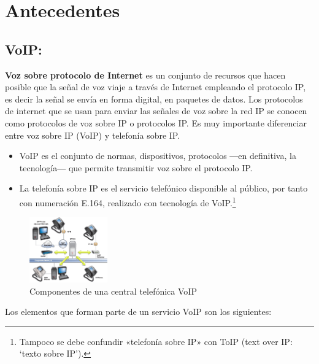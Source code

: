 \documentclass[conference]{IEEEtran}
\begin{document}
\section{Antecedentes}\label{sec:ant}
\subsection{\textbf{ VoIP:}} 
\textbf{Voz sobre protocolo de Internet} es un conjunto de recursos que hacen posible que la señal de voz viaje a través de Internet empleando el protocolo IP, es decir la señal se envía en forma digital, en paquetes de datos. Los protocolos de internet que se usan para enviar las señales de voz sobre la red IP se conocen como protocolos de voz sobre IP o protocolos IP. 
Es muy importante diferenciar entre voz sobre IP (VoIP) y telefonía sobre IP.
\begin{itemize}
\item VoIP es el conjunto de normas, dispositivos, protocolos ―en definitiva, la tecnología― que permite transmitir voz sobre el protocolo IP.
\item La telefonía sobre IP es el servicio telefónico disponible al público, por tanto con numeración E.164, realizado con tecnología de VoIP.\footnote{Tampoco se debe confundir «telefonía sobre IP» con ToIP (text over IP: ‘texto sobre IP’).}
\end{itemize}
\begin{figure}[h]
	\centerline{\includegraphics[width=0.3\textwidth]{img/voip01.jpg}}
	\caption{Componentes de una central telefónica VoIP}
	\label{fig:ant01}
\end{figure}
Los elementos que forman parte de un servicio VoIP son los siguientes:
\end{document}
